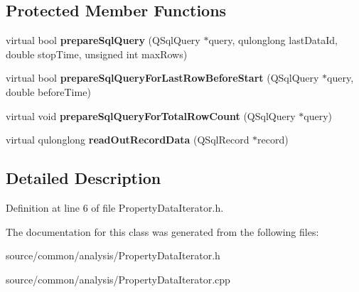 \subsection*{Protected Member Functions}
\begin{DoxyCompactItemize}
\item 
\hypertarget{class_picto_1_1_property_data_iterator_aa69be07074270eb069d3d9caf99d6af4}{virtual bool {\bfseries prepare\-Sql\-Query} (Q\-Sql\-Query $\ast$query, qulonglong last\-Data\-Id, double stop\-Time, unsigned int max\-Rows)}\label{class_picto_1_1_property_data_iterator_aa69be07074270eb069d3d9caf99d6af4}

\item 
\hypertarget{class_picto_1_1_property_data_iterator_a3c9ae02786282aa87809533723e0c95b}{virtual bool {\bfseries prepare\-Sql\-Query\-For\-Last\-Row\-Before\-Start} (Q\-Sql\-Query $\ast$query, double before\-Time)}\label{class_picto_1_1_property_data_iterator_a3c9ae02786282aa87809533723e0c95b}

\item 
\hypertarget{class_picto_1_1_property_data_iterator_a59fac8ddd6d9681cfabaa7fda141ab12}{virtual void {\bfseries prepare\-Sql\-Query\-For\-Total\-Row\-Count} (Q\-Sql\-Query $\ast$query)}\label{class_picto_1_1_property_data_iterator_a59fac8ddd6d9681cfabaa7fda141ab12}

\item 
\hypertarget{class_picto_1_1_property_data_iterator_a46ba771a9fbfd1c6a8d6e648e10e0968}{virtual qulonglong {\bfseries read\-Out\-Record\-Data} (Q\-Sql\-Record $\ast$record)}\label{class_picto_1_1_property_data_iterator_a46ba771a9fbfd1c6a8d6e648e10e0968}

\end{DoxyCompactItemize}


\subsection{Detailed Description}


Definition at line 6 of file Property\-Data\-Iterator.\-h.



The documentation for this class was generated from the following files\-:\begin{DoxyCompactItemize}
\item 
source/common/analysis/Property\-Data\-Iterator.\-h\item 
source/common/analysis/Property\-Data\-Iterator.\-cpp\end{DoxyCompactItemize}
